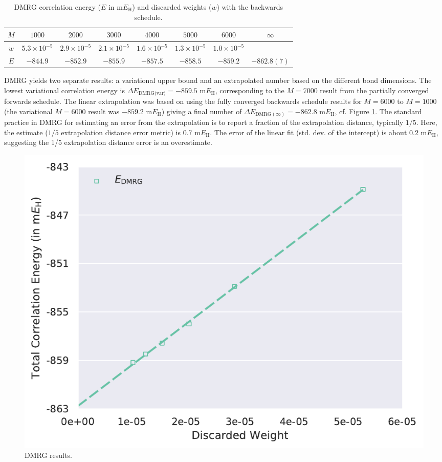 \documentclass[journal=jcp,manuscript=suppinfo]{achemso}
\begin{document}
%
\begin{table}[ht]
\begin{center}
\caption{DMRG correlation energy ($E$ in m$E_{\text{H}}$) and discarded weights ($w$) with the backwards schedule.}
\label{tab:DMRG_reverse}
\begin{tabular}{cccccccc}
\toprule
$M$ & $1000$               & $2000$               & $3000$               & $4000$               & $5000$                & $6000$                & $\infty$    \\ \midrule\midrule
$w$ & $5.3 \times 10^{-5}$ & $2.9 \times 10^{-5}$ & $2.1 \times 10^{-5}$ & $1.6 \times 10^{-5}$ & $1.3 \times 10^{-5}$  & $1.0 \times 10^{-5}$  &             \\
$E$ & $-844.9$ 		   & $-852.9$  		  & $-855.9$ 		 & $-857.5$ 		& $-858.5$ 		& $-859.2$		& $-862.8(7)$ \\
\midrule
\end{tabular}
\vspace{-0.6cm}
\end{center}
\end{table}
%
DMRG yields two separate results: a variational upper bound and an extrapolated number based on the different bond dimensions. The lowest variational correlation energy is $\Delta E_{\text{DMRG(var)}} = -859.5$ m$E_{\text{H}}$, corresponding to the $M=7000$ result from the partially converged forwards schedule. The linear extrapolation was based on using the fully converged backwards schedule results for $M=6000$ to $M=1000$ (the variational $M=6000$ result was $-859.2$ m$E_{\text{H}}$) giving a final number of $\Delta E_{\text{DMRG}(\infty)} = -862.8$ m$E_{\text{H}}$, cf. Figure \ref{dmrg_SI_fig}. The standard practice in DMRG for estimating an error from the extrapolation is to report a fraction of the extrapolation distance, typically $1/5$. Here, the estimate ($1/5$ extrapolation distance error metric) is $0.7$ m$E_{\text{H}}$. The error of the linear fit (std. dev. of the intercept) is about $0.2$ m$E_{\text{H}}$, suggesting the 1/5 extrapolation distance error is an overestimate.
%
\begin{figure}[ht!]
\begin{center}
\includegraphics[scale=0.75]{figures/dmrg/dmrg.pdf}
\caption{DMRG results.}
\label{dmrg_SI_fig}
\end{center}
\end{figure}
%
\end{document}
